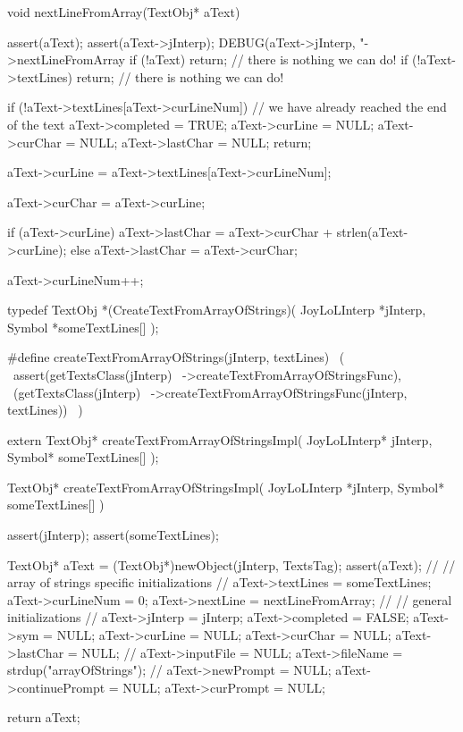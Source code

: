 \startCCode
void nextLineFromArray(TextObj* aText) {
  assert(aText);
  assert(aText->jInterp);
  DEBUG(aText->jInterp, "->nextLineFromArray %
  if (!aText) return;  // there is nothing we can do!
  if (!aText->textLines) return; // there is nothing we can do!

  if (!aText->textLines[aText->curLineNum]) {
    // we have already reached the end of the text
    aText->completed  = TRUE;
    aText->curLine    = NULL;
    aText->curChar    = NULL;
    aText->lastChar   = NULL;
    return;
  }

  aText->curLine  = aText->textLines[aText->curLineNum];

  aText->curChar  = aText->curLine;

  if (aText->curLine) {
    aText->lastChar = aText->curChar + strlen(aText->curLine);
  } else aText->lastChar = aText->curChar;

  aText->curLineNum++;
}
\stopCCode

\startCHeader
typedef TextObj *(CreateTextFromArrayOfStrings)(
  JoyLoLInterp *jInterp,
  Symbol       *someTextLines[]
);

#define createTextFromArrayOfStrings(jInterp, textLines)      \
  (                                                           \
    assert(getTextsClass(jInterp)                             \
      ->createTextFromArrayOfStringsFunc),                    \
    (getTextsClass(jInterp)                                   \
      ->createTextFromArrayOfStringsFunc(jInterp, textLines)) \
  )
\stopCHeader

\setCHeaderStream{private}
\startCHeader
extern TextObj* createTextFromArrayOfStringsImpl(
  JoyLoLInterp* jInterp,
  Symbol* someTextLines[]
);
\stopCHeader
{}

\startCCode
TextObj* createTextFromArrayOfStringsImpl(
  JoyLoLInterp *jInterp,
  Symbol* someTextLines[]
) {
  assert(jInterp);
  assert(someTextLines);
  
  TextObj* aText = (TextObj*)newObject(jInterp, TextsTag);
  assert(aText);
  //
  // array of strings specific initializations
  //
  aText->textLines  = someTextLines;
  aText->curLineNum = 0;
  aText->nextLine   = nextLineFromArray;
  //
  // general initializations
  //
  aText->jInterp    = jInterp;
  aText->completed  = FALSE;
  aText->sym        = NULL;
  aText->curLine    = NULL;
  aText->curChar    = NULL;
  aText->lastChar   = NULL;
  //
  aText->inputFile  = NULL;
  aText->fileName   = strdup("arrayOfStrings");
  //
  aText->newPrompt       = NULL;
  aText->continuePrompt  = NULL;
  aText->curPrompt       = NULL;

  return aText;
}
\stopCCode

